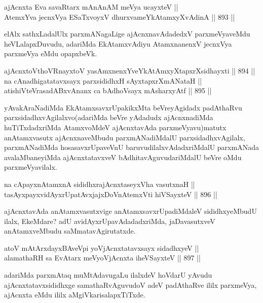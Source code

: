 \begin{shl}
ajAcnxta Eva savaRtarx mAnAnAM meVya ucayxteV || \\
AtemxYva jecnxVya ESaTxvoyxV dhurxvameYkAtamxyXvAdinA \hfill || 893 ||  
\end{shl}

\begin{artha}
elAlx sathxLadalUlx parxmANagaLige ajAcnxnavAdadedxV parxmeVyaveMdu heVLalapxDuvudu, adariMda EkAtamxvAdiyu AtamxnanenxV jecnxVya parxmeVya eMdu opapxbeVk.
\end{artha}

\begin{shl}
ajAcnxtoV\s thoVR\s nayxtoV yasAmxnenxYveYkAtAmxyXtapxrXsidhayxti \hfill || 894 ||  \\
na cAnadhigatatavxsayx parxsididhxH sAyxtapxrXmANataH || \\
atishiVteVrasadABxvAnanx ca bAdhoV\s sayx mAsharxyAtf \hfill || 895 ||  
\end{shl}

\begin{artha}
yAvakAraNadiMda EkAtamxsavxrUpakikxMta beVreyAgidadx padAthaRvu parxsidadhxvAgilalxvo(adariMda beVre yAdadudx ajAcnxnadiMda huTiTxdadxriMda AtamxvoMdeV ajAcnxtavAda parxmeVyavu)matutx anAtamxvasutx ajAcnxnaveMbudu parxmANadiMdalU parxsidadhxvAgilalx, parxmANadiMda hosasavxrUpaveVnU baruvudilalxvAdadxriMdalU parxmANada avalaMbaneyiMda ajAcnxtatavxveV bAdhitavAguvudariMdalU beVre oMdu parxmeVyavilalx.
\end{artha}

\begin{shl}
na cApayxnAtamxnA sididhxrajAcnxtaseyxVha vasutxnaH || \\
tasAyxpayxvidAyxrUpatAvxjajxDoV\s nAtemxVti hiVSayxteV \hfill || 896 ||  
\end{shl}

\begin{artha}
ajAcnxtavAda anAtamxvasutxvige anAtamxsavxrUpadiMdaleV sididhxyeMbudU ilalx, EkeMdare? adU avidAyxrUpavAdadadxriMda, jaDavasutxveV anAtamxveMbudu saMmatavAgirutatxde.
\end{artha}

\begin{shl}
atoV mAtArxdayxBAveV\s pi yoV\s jAcnxtatavxsayx sidadhxyeV || \\
alamathaRH sa EvAtarx meVyoV\s jAcnxta iheVSayxteV \hfill || 897 ||  
\end{shl}

\begin{artha}
adariMda parxmAtaq muMtAdavugaLu ilalxdeV hoVdarU yAvudu ajAcnxtatavxsididhxge samathaRvAguvudoV adeV padAthaRve ililx parxmeVya, ajAcnxta eMdu ililx aMgiVkarisalapxTiTxde.
\end{artha}

